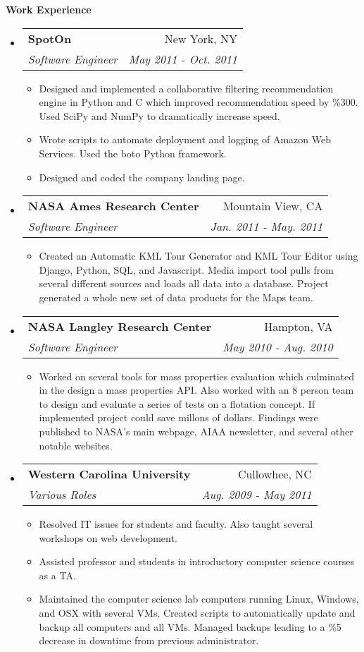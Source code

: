 \documentclass[letterpaper,11pt]{article}
\makeatletter
\newcommand{\resitem}[1]{\item #1 \vspace{-2pt}}
\newcommand{\resheading}[1]{{\large \colorbox{mygrey}{\begin{minipage}{\textwidth}{\textbf{#1 \vphantom{p\^{E}}}}\end{minipage}}}}
\newcommand{\ressubheading}[4]{
\begin{tabular*}{7.0in}{l@{\extracolsep{\fill}}r}
		\textbf{#1} & #2 \\
		\textit{#3} & \textit{#4} \\
\end{tabular*}\vspace{-6pt}}
\makeatother
\begin{document}
\resheading{Work Experience}
\begin{itemize}
\item
	\ressubheading{SpotOn}{New York, NY}{Software Engineer}{May 2011 - Oct. 2011}
	\begin{itemize}
		\resitem{Designed and implemented a collaborative filtering recommendation engine in Python and C which improved recommendation speed by \%300. Used SciPy and NumPy to dramatically increase speed.}
		\resitem{Wrote scripts to automate deployment and logging of Amazon Web Services. Used the boto Python framework.}
		\resitem{Designed and coded the company landing page.}
	\end{itemize}
\item
   \ressubheading{NASA Ames Research Center}{Mountain View, CA}{Software Engineer}{Jan. 2011 - May. 2011}
   \begin{itemize}
      \resitem{Created an Automatic KML Tour Generator and KML Tour Editor using Django, Python, SQL, and Javascript. Media import tool pulls from several different sources and loads all data into a database. Project generated a whole new set of data products for the Maps team.}
   \end{itemize}
\item
   \ressubheading{NASA Langley Research Center}{Hampton, VA}{Software Engineer}{May 2010 - Aug. 2010}
      \begin{itemize}
         \resitem{Worked on several tools for mass properties evaluation
         which culminated in the design a mass properties API. Also worked
         with an 8 person team to design and evaluate a series of tests on
         a flotation concept. If implemented project could save millons of
         dollars. Findings were published to NASA's main webpage, AIAA 
         newsletter, and several other notable websites.}
      \end{itemize}
\item
   \ressubheading{Western Carolina University}{Cullowhee, NC}{Various Roles}{Aug. 2009 - May 2011}
      \begin{itemize}
         \resitem{Resolved IT issues for students and faculty. Also taught several workshops on web development.}
         \resitem{Assisted professor and students in introductory computer science courses as a TA.}
         \resitem{Maintained the computer science lab computers running Linux, Windows, and OSX with several VMs. Created scripts to automatically update and backup all computers and all VMs. Managed backups leading to a \%5 decrease in downtime from previous administrator.}
      \end{itemize}
\end{itemize}
\end{document}
